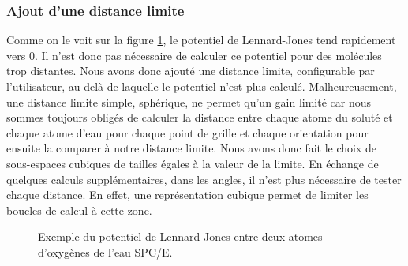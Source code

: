 \subsubsection{Ajout d'une distance limite}
Comme on le voit sur la figure \ref{fig:lj}, le potentiel de Lennard-Jones tend rapidement vers 0. Il n'est donc pas nécessaire de calculer ce potentiel pour des molécules trop distantes. Nous avons donc ajouté une distance limite, configurable par l'utilisateur, au delà de laquelle le potentiel n'est plus calculé. Malheureusement, une distance limite simple, sphérique, ne permet qu'un gain limité car nous sommes toujours obligés de calculer la distance entre chaque atome du soluté et chaque atome d'eau pour chaque point de grille et chaque orientation pour ensuite la comparer à notre distance limite. Nous avons donc fait le choix de sous-espaces cubiques de tailles égales à la valeur de la limite. En échange de quelques calculs supplémentaires, dans les angles, il n'est plus nécessaire de tester chaque distance. En effet, une représentation cubique permet de limiter les boucles de calcul à cette zone.




\begin{figure}[ht]
    \center    
    \caption{Exemple du potentiel de Lennard-Jones entre deux atomes d'oxygènes de l'eau SPC/E.}
    \label{fig:lj}
\end{figure}


